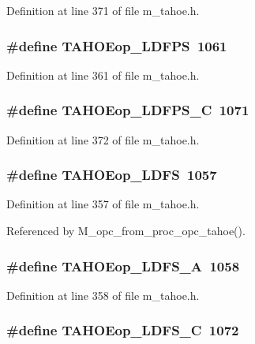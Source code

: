 Definition at line 371 of file m\_\-tahoe.h.
\subsubsection{\setlength{\rightskip}{0pt plus 5cm}\#define TAHOEop\_\-LDFPS~1061}\label{m__tahoe_8h_032a6ee618b5b5d2299f58ca3c3095ed}




Definition at line 361 of file m\_\-tahoe.h.
\subsubsection{\setlength{\rightskip}{0pt plus 5cm}\#define TAHOEop\_\-LDFPS\_\-C~1071}\label{m__tahoe_8h_81dbd0491bb8a11eb9f5c5cb58f585b7}




Definition at line 372 of file m\_\-tahoe.h.
\subsubsection{\setlength{\rightskip}{0pt plus 5cm}\#define TAHOEop\_\-LDFS~1057}\label{m__tahoe_8h_8b69927e9973047bf04c827d9bff7d39}




Definition at line 357 of file m\_\-tahoe.h.

Referenced by M\_\-opc\_\-from\_\-proc\_\-opc\_\-tahoe().
\subsubsection{\setlength{\rightskip}{0pt plus 5cm}\#define TAHOEop\_\-LDFS\_\-A~1058}\label{m__tahoe_8h_912aff980350c0ff217dddc78ed5db2f}




Definition at line 358 of file m\_\-tahoe.h.
\subsubsection{\setlength{\rightskip}{0pt plus 5cm}\#define TAHOEop\_\-LDFS\_\-C~1072}\label{m__tahoe_8h_738d50bfcbc7419a54c96e5b2ad32364}




